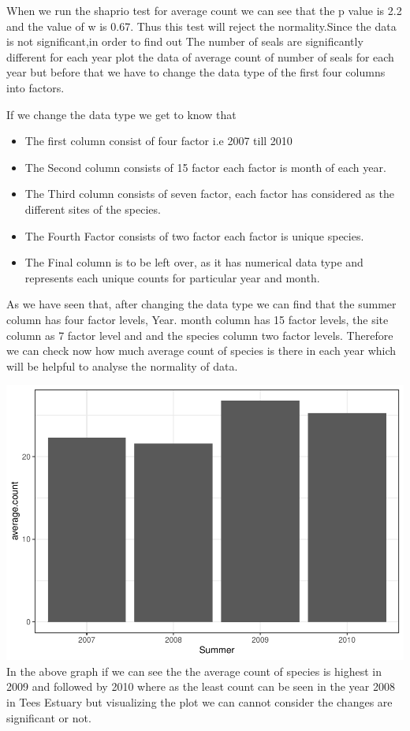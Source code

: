 \documentclass[
]{article}
\providecommand{\tightlist}{%
  \setlength{\itemsep}{0pt}\setlength{\parskip}{0pt}}
\begin{document}
When we run the shaprio test for average count we can see that the p
value is 2.2 and the value of w is 0.67. Thus this test will reject the
normality.Since the data is not significant,in order to find out The
number of seals are significantly different for each year plot the data
of average count of number of seals for each year but before that we
have to change the data type of the first four columns into factors.

If we change the data type we get to know that

\begin{itemize}
\tightlist
\item
  The first column consist of four factor i.e 2007 till 2010
\item
  The Second column consists of 15 factor each factor is month of each
  year.
\item
  The Third column consists of seven factor, each factor has considered
  as the different sites of the species.
\item
  The Fourth Factor consists of two factor each factor is unique
  species.
\item
  The Final column is to be left over, as it has numerical data type and
  represents each unique counts for particular year and month.
\end{itemize}

As we have seen that, after changing the data type we can find that the
summer column has four factor levels, Year. month column has 15 factor
levels, the site column as 7 factor level and and the species column two
factor levels. Therefore we can check now how much average count of
species is there in each year which will be helpful to analyse the
normality of data.

\includegraphics{Statistical-analysis-in-RStudio_files/figure-latex/unnamed-chunk-5-1.pdf}
In the above graph if we can see the the average count of species is
highest in 2009 and followed by 2010 where as the least count can be
seen in the year 2008 in Tees Estuary but visualizing the plot we can
cannot consider the changes are significant or not.
\end{document}
